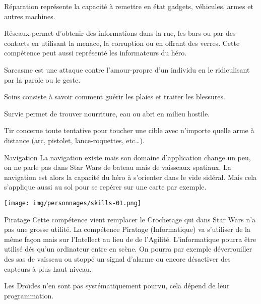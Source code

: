 \begin{description}[align=left]
    \item [Réparation (Int)]
        Réparation représente la capacité à remettre en état gadgets, véhicules, armes et autres machines.

    \item [Réseaux (Int)]
        Réseaux permet d’obtenir des informations dans la rue, les bars ou par des contacts en utilisant la menace, la corruption ou en offrant des verres. Cette compétence peut aussi représenté les informateurs du héro.

    \item [Sarcasme (Int)]
        Sarcasme est une attaque contre l’amour-propre d’un individu en le ridiculisant par la parole ou le geste.

    \item [Soins (Int)]
        Soins consiste à savoir comment guérir les plaies et traiter les blessures.

    \item [Survie (Int)]
        Survie permet de trouver nourriture, eau ou abri en milieu hostile.

    \item [Tir (Agi)]
        Tir concerne toute tentative pour toucher une cible avec n’importe quelle arme à distance (arc, pistolet, lance-roquettes, etc\ldots).
\end{description}
\clearpage
\begin{paperbox}{Navigation}
    La navigation existe mais son domaine d’application change un peu, on ne parle pas dans Star Wars de bateau mais de vaisseaux spatiaux. La navigation est alors la capacité du héro à s’orienter dans le vide sidéral. Mais cela s’applique aussi au sol pour se repérer sur une carte par exemple.
\end{paperbox}

\vspace*{\fill}
\hspace*{-0.5\columnsep}
\texttt{[image: img/personnages/skills-01.png]}

\newpage
\begin{paperbox}{Piratage}
    Cette compétence vient remplacer le Crochetage qui dans Star Wars n’a pas une grosse utilité. La compétence Piratage (Informatique) va s’utiliser de la même façon mais sur l’Intellect au lieu de de l’Agilité. L’informatique pourra être utilisé dés qu’un ordinateur entre en scène. On pourra par exemple déverrouiller des sas de vaisseau ou stoppé un signal d’alarme ou encore désactiver des capteurs à plus haut niveau.

    Les Droïdes n’en sont pas systématiquement pourvu, cela dépend de leur programmation.
\end{paperbox}
